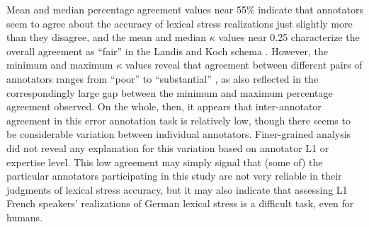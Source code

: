 \documentclass[a4paper]{article}
\begin{document}
		Mean and median percentage agreement values near 55\% indicate that annotators seem to agree about the accuracy of lexical stress realizations just slightly more than they disagree, and the mean and median $\kappa$ values near 0.25 characterize the overall agreement as ``fair'' in the Landis and Koch schema \cite{Landis1977}. However, the minimum and maximum $\kappa$ values reveal that agreement between different pairs of annotators ranges from ``poor'' to ``substantial'' \cite{Landis1977}, as also reflected in the correspondingly large gap between the minimum and maximum percentage agreement observed.
		On the whole, then, it appears that inter-annotator agreement in this error annotation task is relatively low, though there seems to be considerable variation between individual annotators. Finer-grained analysis did not reveal any explanation for this variation based on annotator L1 or expertise level. This low agreement may simply signal that (some of) the particular annotators participating in this study are not very reliable in their judgments of lexical stress accuracy, but it may also indicate that %
		assessing 
		L1 French speakers' realizations of German lexical stress is a difficult task, even for humans.
	
	

		
		
\end{document}
